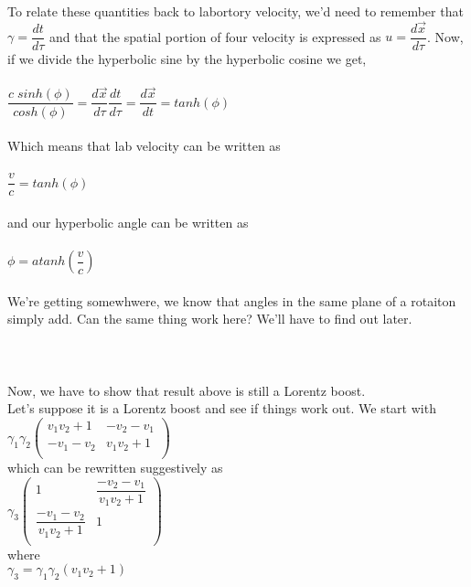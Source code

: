 \documentclass[prb,preprint]
{revtex4-1}
\newcommand{\PRLsep}{\noindent\makebox[\linewidth]{\resizebox{0.8888\linewidth}{2pt}{$\bullet$}}\bigskip}
\begin{document}
\\
\\
To relate these quantities back to labortory velocity, we'd need to remember that $\gamma = \dfrac{dt}{d\tau}$ and that the spatial portion of four velocity is expressed as $u = \dfrac{d\vec{x}}{d\tau}$.  Now, if we divide the hyperbolic sine by the hyperbolic cosine we get, 
\\
\\
$\dfrac{c\;sinh\left(\phi\right)}{cosh\left(\phi\right)} = \dfrac{d\vec{x}}{d\tau} \dfrac{dt}{d\tau} = \dfrac{d\vec{x}}{dt} = tanh\left(\phi\right)$
\\
\\
Which means that lab velocity can be written as
\\
\\
$\dfrac{v}{c} = tanh\left(\phi\right)$
\\
\\
and our hyperbolic angle can be written as 
\\
\\
$\phi = atanh\left(\dfrac{v}{c}\right)$
\\
\\
We're getting somewhwere, we know that angles in the same plane of a rotaiton simply add.  Can the same thing work here?  We'll have to find out later.
\\
\\
\PRLsep
\\
\\
Now, we have to show that result above is still a Lorentz boost.
\\
Let's suppose it is a Lorentz boost and see if things work out.  We start with
\\
$\gamma_1 \gamma_2 
\begin{pmatrix}
v_1 v_2 + 1 & -v_2 - v_1\\
-v_1 - v_2 & v_1 v_2 + 1\\
\end{pmatrix} $
\\
which can be rewritten suggestively as
\\
$\gamma_3 
\begin{pmatrix}
1 & \dfrac{-v_2 - v_1}{v_1 v_2 + 1}\\
\dfrac{-v_1 - v_2}{v_1 v_2 + 1} & 1\\
\end{pmatrix} $
\\
where 
\\
$\gamma_3 = \gamma_1 \gamma_2 \left(v_1 v_2 + 1\right)$
\\
\end{document}
